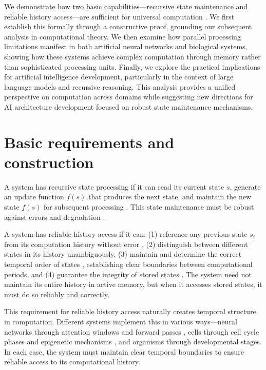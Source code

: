 \documentclass[12pt]{article}
\begin{document}
We demonstrate how two basic capabilities---recursive state maintenance and reliable history access---are sufficient for universal computation \cite{bennett1989time,boyle2024memory}.
We first establish this formally through a constructive proof, grounding our subsequent analysis in computational theory.
We then examine how parallel processing limitations manifest in both artificial neural networks and biological systems, showing how these systems achieve complex computation through memory rather than sophisticated processing units.
Finally, we explore the practical implications for artificial intelligence development, particularly in the context of large language models and recursive reasoning.
This analysis provides a unified perspective on computation across domains while suggesting new directions for AI architecture development focused on robust state maintenance mechanisms.

\section{Basic requirements and construction}

A system has recursive state processing if it can read its current state $s$, generate an update function $f(s)$ that produces the next state, and maintain the new state $f(s)$ for subsequent processing \cite{manuri2019state}.
This state maintenance must be robust against errors and degradation \cite{yang2013survey}.

A system has reliable history access if it can: (1) reference any previous state $s_i$ from its computation history without error \cite{fu2024memory}, (2) distinguish between different states in its history unambiguously, (3) maintain and determine the correct temporal order of states \cite{berridge2014cell,pastor2020computation}, establishing clear boundaries between computational periods, and (4) guarantee the integrity of stored states \cite{lovkvist2021using}.
The system need not maintain its entire history in active memory, but when it accesses stored states, it must do so reliably and correctly.

This requirement for reliable history access naturally creates temporal structure in computation.
Different systems implement this in various ways---neural networks through attention windows and forward passes \cite{martini2015information,quentin2019differential}, cells through cell cycle phases and epigenetic mechanisms \cite{bruno2022epigenetic}, and organisms through developmental stages.
In each case, the system must maintain clear temporal boundaries to ensure reliable access to its computational history.
\end{document}
